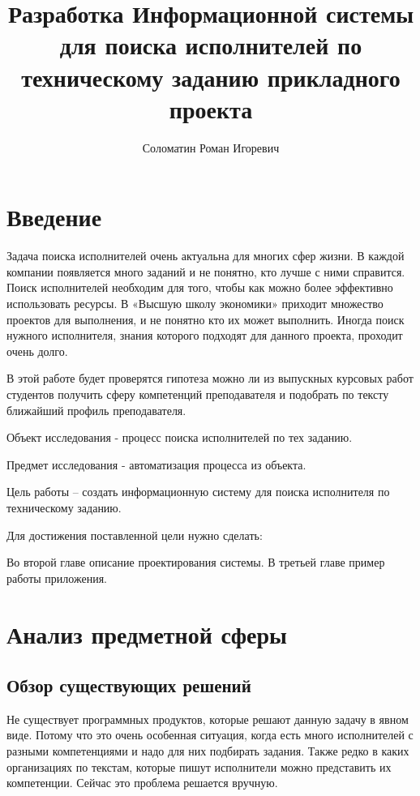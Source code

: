 \documentclass[PI,KR]{HSEUniversity}
\title{Разработка Информационной системы для поиска исполнителей по техническому заданию прикладного проекта}
\author{Соломатин Роман Игоревич}
\begin{document}
\maketitle

\chapter*{Введение}

Задача поиска исполнителей очень актуальна для многих сфер жизни. В каждой компании появляется много заданий и не понятно, кто лучше с ними справится. Поиск исполнителей необходим для того, чтобы как можно более эффективно использовать ресурсы. В «Высшую школу экономики» приходит множество проектов для выполнения, и не понятно кто их может выполнить. Иногда поиск нужного исполнителя,  знания которого подходят для данного проекта, проходит очень долго.

В этой работе будет проверятся гипотеза можно ли из выпускных курсовых работ студентов получить сферу компетенций преподавателя и подобрать по тексту ближайший профиль преподавателя.

Объект исследования - процесс поиска исполнителей по тех заданию.

Предмет исследования - автоматизация процесса из объекта.

Цель работы – создать информационную систему для поиска исполнителя по техническому заданию.

Для достижения поставленной цели нужно сделать:

Во второй главе описание проектирования системы.
В третьей главе пример работы приложения.

\chapter{Анализ предметной сферы}
\section{Обзор существующих решений}
Не существует программных продуктов, которые решают данную задачу в явном виде. Потому что это очень особенная ситуация, когда есть много исполнителей с разными компетенциями и надо для них подбирать задания. Также редко в каких организациях по текстам, которые пишут исполнители можно представить их компетенции. Сейчас это проблема решается вручную.
\end{document}
